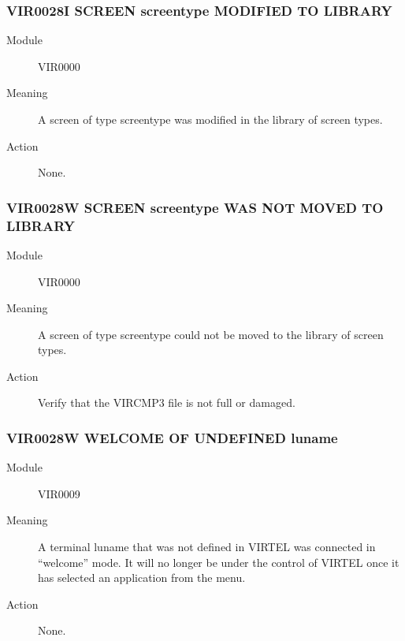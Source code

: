 \documentclass[letterpaper,10pt,english]{sphinxmanual}
\begin{document}
\subsubsection{VIR0028I SCREEN screentype MODIFIED TO LIBRARY}
\label{\detokenize{messages:vir0028i-screen-screentype-modified-to-library}}\begin{description}
\item[{Module}] \leavevmode
VIR0000

\item[{Meaning}] \leavevmode
A screen of type screentype was modified in the library of screen types.

\item[{Action}] \leavevmode
None.

\end{description}


\subsubsection{VIR0028W SCREEN screentype WAS NOT MOVED TO LIBRARY}
\label{\detokenize{messages:vir0028w-screen-screentype-was-not-moved-to-library}}\begin{description}
\item[{Module}] \leavevmode
VIR0000

\item[{Meaning}] \leavevmode
A screen of type screentype could not be moved to the library of screen types.

\item[{Action}] \leavevmode
Verify that the VIRCMP3 file is not full or damaged.

\end{description}


\subsubsection{VIR0028W WELCOME OF UNDEFINED luname}
\label{\detokenize{messages:vir0028w-welcome-of-undefined-luname}}\begin{description}
\item[{Module}] \leavevmode
VIR0009

\item[{Meaning}] \leavevmode
A terminal luname that was not defined in VIRTEL was connected in “welcome” mode. It will no longer be under the control of VIRTEL once it has selected an application from the menu.

\item[{Action}] \leavevmode
None.

\end{description}
\end{document}

